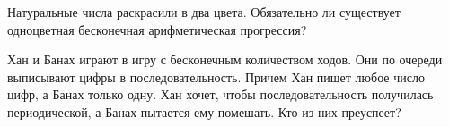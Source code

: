 \begin{problems}
\item
Натуральные числа раскрасили в два цвета.
Обязательно ли существует одноцветная бесконечная арифметическая прогрессия?

\item
Хан и Банах играют в игру с бесконечным количеством ходов.
Они по очереди выписывают цифры в последовательность.
Причем Хан пишет любое число цифр, а Банах только одну.
Хан хочет, чтобы последовательность получилась периодической, а Банах пытается
ему помешать.
Кто из них преуспеет?

\end{problems}

